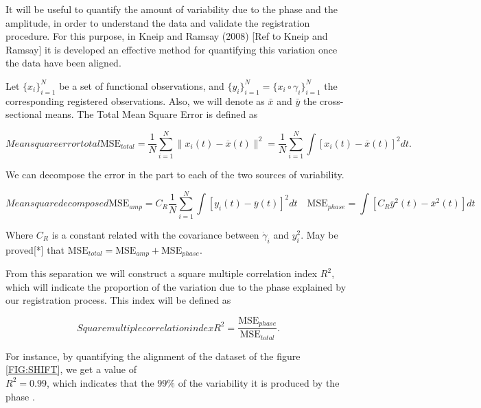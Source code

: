 It will be useful to quantify the amount of variability due to the phase and the
amplitude, in order to understand the data and validate the registration
procedure. For this purpose, in Kneip and Ramsay (2008)
[Ref to Kneip and Ramsay] it is developed an effective method for quantifying
this variation once the data have been aligned.

Let $\{x_i\}_{i=1}^N$ be a set of functional observations, and
$\{y_i\}_{i=1}^N = \{x_i \circ \gamma_i\}_{i=1}^N$ the corresponding registered
observations. Also, we will denote as $\bar x$ and $\bar y$ the
cross-sectional means. The Total Mean Square Error is defined as

\begin{equation}[]{Mean square error total}
\text{MSE}_{total}=  \frac{1}{N}\sum_{i=1}^{N} \|x_i(t)-\overline x(t)\|^2 =
\frac{1}{N}\sum_{i=1}^{N}\int[x_i(t)-\overline x(t)]^2dt .
\end{equation}

We can decompose the error in the part to each of the two sources of variability.

\begin{equation}[]{Mean square decomposed}
\text{MSE}_{amp} =  C_R \frac{1}{N}
        \sum_{i=1}^{N} \int \left [ y_i(t) - \overline{y}(t) \right ]^2 dt \quad
\text{MSE}_{phase}=
        \int \left [C_R \overline{y}^2(t) - \overline{x}^2(t) \right]dt
\end{equation}

Where $C_R$ is a constant related with the covariance between $\dot \gamma_i$
and $y_i^2$. May be  proved[*] that 
$
\text{MSE}_{total} = \text{MSE}_{amp} + \text{MSE}_{phase}.
$


From this separation we will construct a square multiple correlation index
$R^2$, which will indicate the proportion of the variation due to the phase
explained by our registration process. This index will be defined as

\begin{equation}[]{Square multiple correlation index}
R^2 = \frac{\text{MSE}_{phase}}{\text{MSE}_{total}}.
\end{equation}

For instance, by quantifying the alignment of the dataset of the figure
\ref{FIG:SHIFT}, we get a value of \\ $R^2=0.99$, which indicates that the $99\%$ of
the variability it is produced by the phase .
